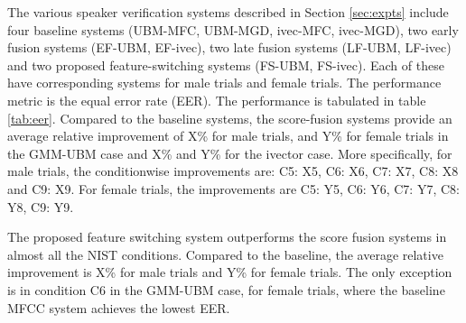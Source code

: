 \documentclass{article}
\begin{document}
The various speaker verification systems described in Section \ref{sec:expts} 
include four baseline systems (UBM-MFC, UBM-MGD, ivec-MFC, ivec-MGD), two early
fusion systems (EF-UBM, EF-ivec), two late fusion systems (LF-UBM, LF-ivec) 
and two proposed feature-switching systems (FS-UBM, FS-ivec). Each of these have 
corresponding systems for male trials and female trials. The performance metric 
is the equal error rate (EER). The performance is tabulated in table \ref{tab:eer}.
Compared to the baseline systems, the score-fusion systems provide an average
relative improvement of X\% for male trials, and Y\% for female trials in the
GMM-UBM case and X\% and Y\% for the ivector case. 
More specifically, for male trials, the
conditionwise improvements are: C5: X5, C6: X6, C7: X7, C8: X8 and C9: X9. For
female trials, the improvements are C5: Y5, C6: Y6, C7: Y7, C8: Y8, C9: Y9.



The proposed feature switching system outperforms the score fusion systems in
almost all the NIST conditions. Compared to the baseline, the average relative
improvement is X\% for male trials and Y\% for female trials. The only exception
is in condition C6 in the GMM-UBM case, for female trials, where the baseline
MFCC system achieves the lowest EER.
\end{document}
